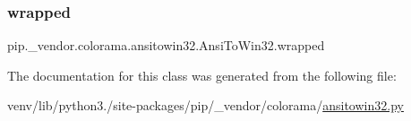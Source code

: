 \subsubsection{\texorpdfstring{wrapped}{wrapped}}
{\footnotesize\ttfamily pip.\+\_\+vendor.\+colorama.\+ansitowin32.\+Ansi\+To\+Win32.\+wrapped}



The documentation for this class was generated from the following file\+:\begin{DoxyCompactItemize}
\item 
venv/lib/python3./site-\/packages/pip/\+\_\+vendor/colorama/\hyperlink{ansitowin32_8py}{ansitowin32.\+py}\end{DoxyCompactItemize}
